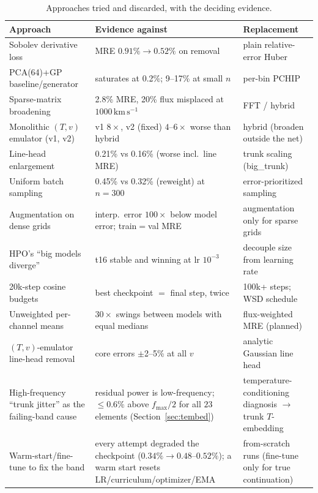 \documentclass[11pt,a4paper]{article}
\newcommand{\kms}{\,\mathrm{km\,s^{-1}}}
\begin{document}
\begin{table}[ht]
\centering
\small
\begin{tabular}{p{4.6cm}p{4.6cm}p{5.2cm}}
\toprule
Approach & Evidence against & Replacement\\
\midrule
Sobolev derivative loss & MRE $0.91\%\to0.52\%$ on removal & plain
relative-error Huber\\
PCA(64)+GP baseline/generator & saturates at 0.2\%; 9--17\% at small
$n$ & per-bin PCHIP\\
Sparse-matrix broadening & 2.8\% MRE, 20\% flux misplaced at
$1000\kms$ & FFT / hybrid\\
Monolithic $(T,v)$ emulator (v1, v2) & v1 $8\times$, v2 (fixed)
$4$--$6\times$ worse than hybrid & hybrid (broaden outside the net)\\
Line-head enlargement & 0.21\% vs 0.16\% (worse incl.\ line MRE) &
trunk scaling (big\_trunk)\\
Uniform batch sampling & 0.45\% vs 0.32\% (reweight) at $n=300$ &
error-prioritized sampling\\
Augmentation on dense grids & interp.\ error $100\times$ below model
error; train$=$val MRE & augmentation only for sparse grids\\
HPO's ``big models diverge'' & t16 stable and winning at
lr $10^{-3}$ & decouple size from learning rate\\
20k-step cosine budgets & best checkpoint $=$ final step, twice &
100k+ steps; WSD schedule\\
Unweighted per-channel means & $30\times$ swings between models with
equal medians & flux-weighted MRE (planned)\\
$(T,v)$-emulator line-head removal & core errors $\pm$2--5\% at all
$v$ & analytic Gaussian line head\\
High-frequency ``trunk jitter'' as the failing-band cause &
residual power is low-frequency; $\le0.6\%$ above $f_{\max}/2$ for all
$23$ elements (Section~\ref{sec:tembed}) & temperature-conditioning
diagnosis $\to$ trunk $T$-embedding\\
Warm-start/fine-tune to fix the band & every attempt degraded the
checkpoint ($0.34\%\to0.48$--$0.52\%$); a warm start resets
LR/curriculum/optimizer/EMA & from-scratch runs (fine-tune only for true
continuation)\\
\bottomrule
\end{tabular}
\caption{Approaches tried and discarded, with the deciding evidence.}
\label{tab:discarded}
\end{table}
\end{document}
